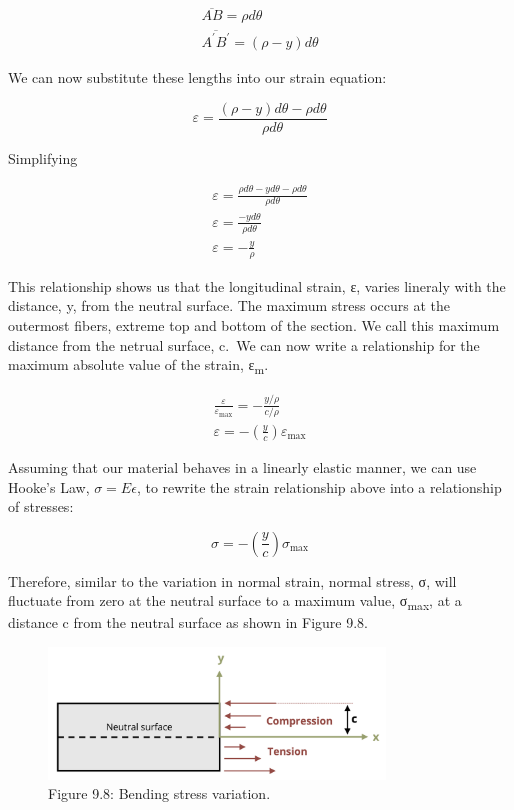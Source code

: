 \documentclass[
  letterpaper,
  DIV=11,
  numbers=noendperiod]{scrreprt}
\begin{document}
\[
\begin{gathered}
\overline{A B}=\rho d \theta \\
\overline{A^{\prime} B^{\prime}}=(\rho-y) d \theta
\end{gathered}
\]

We can now substitute these lengths into our strain equation:

\[
\varepsilon=\frac{(\rho-y) d \theta-\rho d \theta}{\rho d \theta}
\]

Simplifying

\[
\begin{gathered}
\varepsilon=\frac{\rho d \theta-y d \theta-\rho d \theta}{\rho d \theta} \\
\varepsilon=\frac{-y d \theta}{\rho d \theta} \\
\varepsilon=-\frac{y}{\rho}
\end{gathered}
\]

This relationship shows us that the longitudinal strain, ε, varies
lineraly with the distance, y, from the neutral surface. The maximum
stress occurs at the outermost fibers, extreme top and bottom of the
section. We call this maximum distance from the netrual surface, c.~We
can now write a relationship for the maximum absolute value of the
strain, ε\textsubscript{m}.

\[
\begin{gathered}
\frac{\varepsilon}{\varepsilon_{\max }}=-\frac{y / \rho}{c / \rho} \\
\varepsilon=-\left(\frac{y}{c}\right) \varepsilon_{\max }
\end{gathered}
\]

Assuming that our material behaves in a linearly elastic manner, we can
use Hooke's Law, \(\sigma = E \epsilon\), to rewrite the strain
relationship above into a relationship of stresses:

\[
\sigma=-\left(\frac{y}{c}\right) \sigma_{\max }
\]

Therefore, similar to the variation in normal strain, normal stress, σ,
will fluctuate from zero at the neutral surface to a maximum value,
σ\textsubscript{max}, at a distance c from the neutral surface as shown
in Figure 9.8.

\begin{figure}[H]

{\centering \includegraphics[width=3.52083in,height=\textheight]{images/CH9 PNGs/Figure 9.8.png}

}

\caption{Figure 9.8: Bending stress variation.}

\end{figure}%
\end{document}
